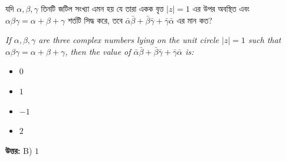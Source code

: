 \documentclass[12pt, a4paper]{article}
\begin{document}
\vspace{1.5em}

\begin{tcolorbox}[questionbox={প্রশ্ন (Question) 3}]
    \noindent
    যদি $\alpha, \beta, \gamma$ তিনটি জটিল সংখ্যা এমন হয় যে তারা একক বৃত্ত $|z| = 1$ এর উপর অবস্থিত এবং $\alpha\beta\gamma = \alpha + \beta + \gamma$ শর্তটি সিদ্ধ করে, তবে $\bar{\alpha}\bar{\beta} + \bar{\beta}\bar{\gamma} + \bar{\gamma}\bar{\alpha}$ এর মান কত?
    
    \vspace{0.8em}
    \begin{english}
    \noindent\textit{\color{darkgray}
    If $\alpha, \beta, \gamma$ are three complex numbers lying on the unit circle $|z| = 1$ such that $\alpha\beta\gamma = \alpha + \beta + \gamma$, then the value of $\bar{\alpha}\bar{\beta} + \bar{\beta}\bar{\gamma} + \bar{\gamma}\bar{\alpha}$ is:
    }
    \end{english}
\end{tcolorbox}

\begin{itemize}[label={}, leftmargin=1cm, itemsep=0.5em]
    \item[\textbf{A)}] $0$
    \item[\textbf{B)}] $1$
    \item[\textbf{C)}] $-1$
    \item[\textbf{D)}] $2$
\end{itemize}

\vspace{0.5em}
\begin{tcolorbox}[answerbox]
    \textbf{\color{success} উত্তর:} B) $1$
\end{tcolorbox}
\vspace{1em}
\end{document}

